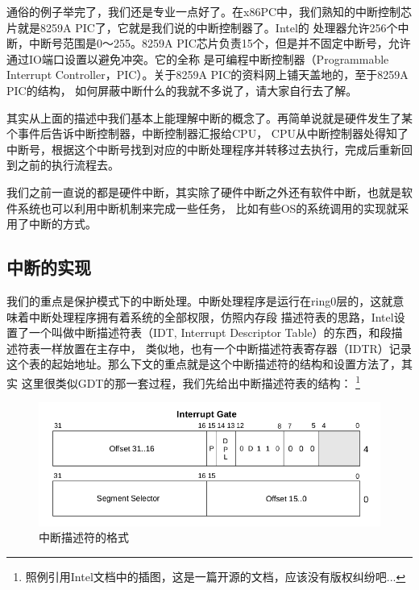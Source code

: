 \par 通俗的例子举完了，我们还是专业一点好了。在x86PC中，我们熟知的中断控制芯片就是8259A PIC了，它就是我们说的中断控制器了。Intel的\allowbreak
处理器允许256个中断，中断号范围是0～255。8259A PIC芯片负责15个，但是并不固定中断号，允许通过IO端口设置以避免冲突。它的全称\allowbreak
是可编程中断控制器（Programmable Interrupt Controller，PIC）。关于8259A PIC的资料网上铺天盖地的，至于8259A PIC的结构，\allowbreak
如何屏蔽中断什么的我就不多说了，请大家自行去了解。

\par 其实从上面的描述中我们基本上能理解中断的概念了。再简单说就是硬件发生了某个事件后告诉中断控制器，中断控制器汇报给CPU，\allowbreak
CPU从中断控制器处得知了中断号，根据这个中断号找到对应的中断处理程序并转移过去执行，完成后重新回到之前的执行流程去。

\par 我们之前一直说的都是硬件中断，其实除了硬件中断之外还有软件中断，也就是软件系统也可以利用中断机制来完成一些任务，\allowbreak
比如有些OS的系统调用的实现就采用了中断的方式。

\subsection{中断的实现}

\par 我们的重点是保护模式下的中断处理。中断处理程序是运行在ring0层的，这就意味着中断处理程序拥有着系统的全部权限，仿照内存段\allowbreak
描述符表的思路，Intel设置了一个叫做中断描述符表（IDT, Interrupt Descriptor Table）的东西，和段描述符表一样放置在主存中，\allowbreak
类似地，也有一个中断描述符表寄存器（IDTR）记录这个表的起始地址。那么下文的重点就是这个中断描述符的结构和设置方法了，其实\allowbreak
这里很类似GDT的那一套过程，我们先给出中断描述符表的结构：\allowbreak
\footnote{照例引用Intel文档中的插图，这是一篇开源的文档，应该没有版权纠纷吧...}

\begin{figure}[ht]
      \centering
      \includegraphics[scale=0.5]{picture/chapt7/interrupt_gate.png}
      \caption{中断描述符的格式}
\end{figure}


